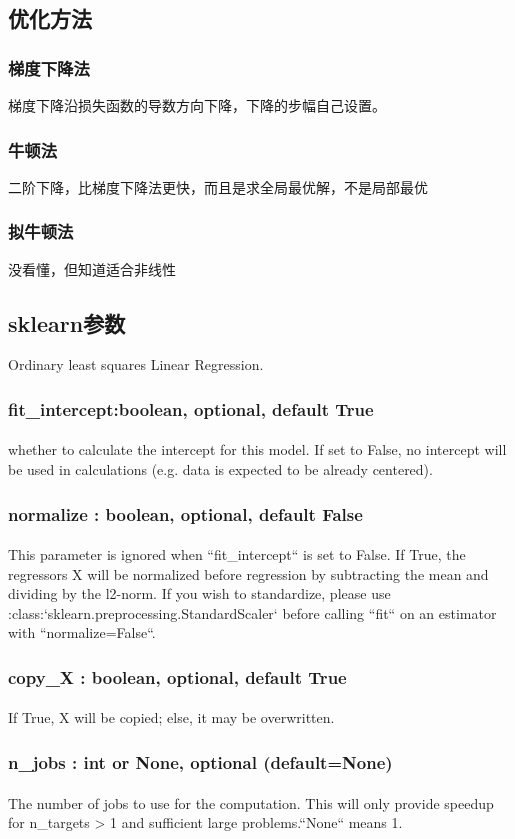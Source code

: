 \documentclass[18pt,a4paper,oneside,UTF8]{ctexart}
\begin{document}
\subsection{优化方法}
\subsubsection{梯度下降法}
梯度下降沿损失函数的导数方向下降，下降的步幅自己设置。
\subsubsection{牛顿法}
二阶下降，比梯度下降法更快，而且是求全局最优解，不是局部最优
\subsubsection{拟牛顿法}
没看懂，但知道适合非线性
\subsection{sklearn参数}
Ordinary least squares Linear Regression.
\subsubsection{fit\_intercept:boolean, optional, default True}
\paragraph{}whether to calculate the intercept for this model. If set
to False, no intercept will be used in calculations
(e.g. data is expected to be already centered).
\subsubsection{normalize : boolean, optional, default False}
\paragraph{}This parameter is ignored when ``fit\_intercept`` is set to False.
If True, the regressors X will be normalized before regression by
subtracting the mean and dividing by the l2-norm.
If you wish to standardize, please use
:class:`sklearn.preprocessing.StandardScaler` before calling ``fit`` on
an estimator with ``normalize=False``.
\subsubsection{copy\_X : boolean, optional, default True}
\paragraph{}If True, X will be copied; else, it may be overwritten.
\subsubsection{n\_jobs : int or None, optional (default=None)}
\paragraph{}The number of jobs to use for the computation. This will only provide
speedup for n\_targets > 1 and sufficient large problems.``None`` means 1.
\end{document}
